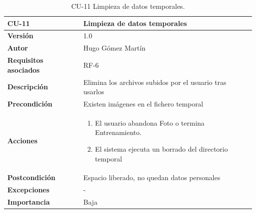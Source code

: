 \begin{table}[p]
	\centering
	\begin{tabularx}{\linewidth}{ p{} p{} }
		\toprule
		\textbf{CU-11}    & \textbf{Limpieza de datos temporales}\\
		\toprule
		\textbf{Versión}              & 1.0    \\
		\textbf{Autor}                & Hugo Gómez Martín \\
		\textbf{Requisitos asociados} & RF-6 \\
		\textbf{Descripción}          & Elimina los archivos subidos por el usuario tras usarlos \\
		\textbf{Precondición}         & Existen imágenes en el fichero temporal \\
		\textbf{Acciones}             &
		\begin{enumerate}
			\def\labelenumi{\arabic{enumi}.}
			\tightlist
			\item El usuario abandona Foto o termina Entrenamiento.
			\item El sistema ejecuta un borrado del directorio temporal
		\end{enumerate}\\
		\textbf{Postcondición}        & Espacio liberado, no quedan datos personales \\
		\textbf{Excepciones}          & - \\
		\textbf{Importancia}          & Baja \\
		\bottomrule
	\end{tabularx}
	\caption{CU-11 Limpieza de datos temporales.}
\end{table}